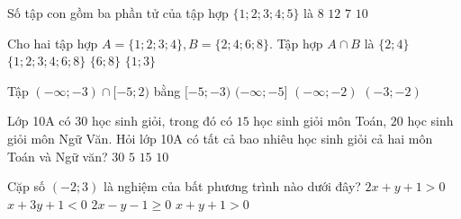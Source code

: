 \begin{ex}%
	Số tập con gồm ba phần tử của tập hợp $\{1 ; 2 ; 3 ; 4 ; 5\}$ là
	\choice
	{$ 8  $}
	{$ 12  $}
	{$ 7  $}
	{\True $ 10  $}
\end{ex}

\begin{ex}%
	Cho hai tập hợp $A=\{1 ; 2 ; 3 ; 4\}, B=\{2 ; 4 ; 6 ; 8\}$. Tập hợp $A \cap B$ là
	\choice
	{\True $\{2 ; 4\}$}
	{$\{1 ; 2 ; 3 ; 4 ; 6 ; 8\}$}
	{$\{6 ; 8\}$}
	{$\{1 ; 3\}$}
\end{ex}

\begin{ex}%
	Tập $(-\infty ;-3) \cap[-5 ; 2)$ bằng
	\choice
	{\True$[-5 ;-3)$}
	{$(-\infty ;-5]$}
	{$(-\infty ;-2)$}
	{$(-3 ;-2)$}
	\loigiai{
	Ta có $(-\infty ;-3) \cap[-5 ; 2) =[-5 ;-3)$.
	}
\end{ex}

\begin{ex}%
	Lớp 10A có $ 30 $ học sinh giỏi, trong đó có $ 15 $ học sinh giỏi môn Toán, $ 20 $ học sinh giỏi môn Ngữ Văn. Hỏi lớp 10A có tất cả bao nhiêu học sinh giỏi cả hai môn Toán và Ngữ văn?
	\choice
	{$ 30  $}
	{\True $ 5  $}
	{$ 15  $}
	{$ 10  $}
\end{ex}

\begin{ex}%
	Cặp số $(-2 ; 3)$ là nghiệm của bất phương trình nào dưới đây?
	\choice
	{$2 x+y+1>0$}
	{$x+3 y+1<0$}
	{$2 x-y-1 \geq 0$}
		{\True $x+y+1>0$}
\end{ex}

